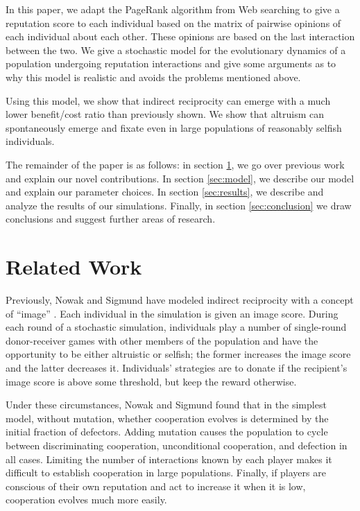 \documentclass{amsart}
\begin{document}
In this paper, we adapt the PageRank algorithm from Web searching to
give a reputation score to each individual based on the matrix of
pairwise opinions of each individual about each other. These opinions
are based on the last interaction between the two. We give a
stochastic model for the evolutionary dynamics of a population
undergoing reputation interactions and give some arguments as to why
this model is realistic and avoids the problems mentioned above.

Using this model, we show that indirect reciprocity can emerge with a
much lower benefit/cost ratio than previously shown. We show that
altruism can spontaneously emerge and fixate even in large populations
of reasonably selfish individuals.

The remainder of the paper is as follows: in section
\ref{sec:related}, we go over previous work and explain our novel
contributions. In section \ref{sec:model}, we describe our model and
explain our parameter choices. In section \ref{sec:results}, we
describe and analyze the results of our simulations. Finally, in
section \ref{sec:conclusion} we draw conclusions and suggest further
areas of research.

\section{Related Work}\label{sec:related}

Previously, Nowak and Sigmund have modeled indirect reciprocity with a
concept of ``image'' \cite{nowak_evolution_1998}. Each individual in
the simulation is given an image score. During each round of a
stochastic simulation, individuals play a number of single-round
donor-receiver games with other members of the population and have the
opportunity to be either altruistic or selfish; the former increases
the image score and the latter decreases it. Individuals’ strategies
are to donate if the recipient’s image score is above some threshold,
but keep the reward otherwise.

Under these circumstances, Nowak and Sigmund found that in the
simplest model, without mutation, whether cooperation evolves is
determined by the initial fraction of defectors. Adding mutation
causes the population to cycle between discriminating cooperation,
unconditional cooperation, and defection in all cases. Limiting the
number of interactions known by each player makes it difficult to
establish cooperation in large populations. Finally, if players are
conscious of their own reputation and act to increase it when it is
low, cooperation evolves much more easily.
\end{document}
